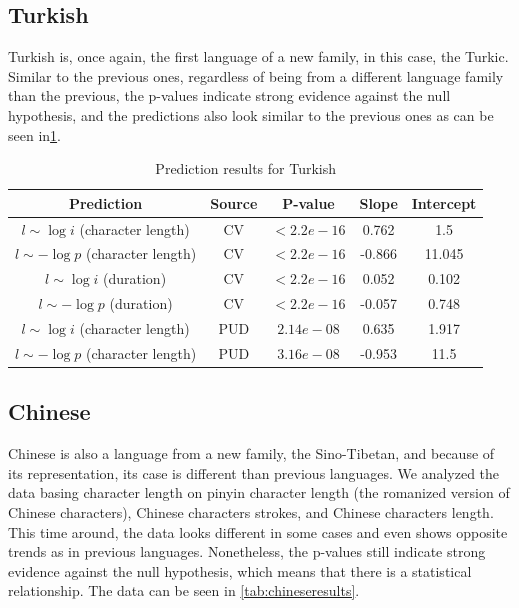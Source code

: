 \subsection{Turkish}

Turkish is, once again, the first language of a new family, in this case, the Turkic. Similar to the previous ones, regardless of being from a different language family than the previous, the p-values indicate strong evidence against the null hypothesis, and the predictions also look similar to the previous ones as can be seen in\cref{tab:turkishresults}.

\begin{table}[H]
    \centering
    \begin{tabular}{c|c|c|c|c}
        Prediction & Source & P-value & Slope & Intercept \\ \hline
        $l \sim \log i$ (character length) & CV & $<2.2e-16$ & 0.762 & 1.5 \\
        $l \sim -\log p$ (character length) & CV & $<2.2e-16$ & -0.866 & 11.045 \\
        $l \sim \log i$ (duration) & CV & $<2.2e-16$ & 0.052 & 0.102 \\
        $l \sim -\log p$ (duration) & CV & $<2.2e-16$ & -0.057 & 0.748 \\
        $l \sim \log i$ (character length) & PUD & $2.14e-08$ & 0.635 & 1.917 \\
        $l \sim -\log p$ (character length) & PUD & $3.16e-08$ & -0.953 & 11.5 \\
    \end{tabular}
    \caption{Prediction results for Turkish}
    \label{tab:turkishresults}
\end{table}

\subsection{Chinese}

Chinese is also a language from a new family, the Sino-Tibetan, and because of its representation, its case is different than previous languages. We analyzed the data basing character length on pinyin character length (the romanized version of Chinese characters), Chinese characters strokes, and Chinese characters length. This time around, the data looks different in some cases and even shows opposite trends as in previous languages. Nonetheless, the p-values still indicate strong evidence against the null hypothesis, which means that there is a statistical relationship. The data can be seen in \cref{tab:chineseresults}.

